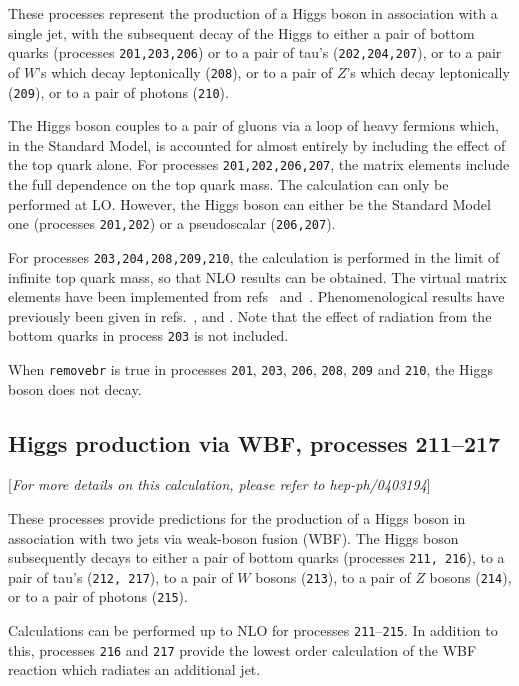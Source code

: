 \documentclass[12pt]{article}
\begin{document}
These processes represent the production of a Higgs boson in association
with a single jet, with the subsequent decay of the Higgs to either
a pair of bottom quarks (processes {\tt 201,203,206}) 
or to a pair of tau's ({\tt 202,204,207}),
or to a pair of $W$'s which decay leptonically ({\tt 208}),
or to a pair of $Z$'s which decay leptonically ({\tt 209}),
or to a pair of photons ({\tt 210}).

The Higgs boson couples to a pair of gluons via a loop of heavy fermions
which, in the Standard Model, is accounted for almost entirely by including
the effect of the top quark alone. For processes {\tt 201,202,206,207}, the
matrix elements include the full dependence on the top quark mass.
The calculation can only be performed at LO. 
However, the Higgs boson can either be the Standard Model one
(processes {\tt 201,202}) or a pseudoscalar ({\tt 206,207}).

For processes {\tt 203,204,208,209,210}, the calculation is performed in the
limit of infinite top quark mass, so that NLO results can be obtained.
The virtual matrix elements have been implemented from
refs~\cite{Ravindran:2002dc} and~\cite{Schmidt:1997wr}.
Phenomenological results have previously been 
given in refs.~\cite{deFlorian:1999zd},\cite{Ravindran:2002dc} 
and \cite{Glosser:2002gm}.
Note that the effect of radiation from the bottom quarks in process {\tt 203}
is not included.

When {\tt removebr} is true in processes {\tt 201}, {\tt 203}, {\tt 206}, {\tt 208}, {\tt 209}
and {\tt 210}, the Higgs boson does not decay.

\subsection{Higgs production via WBF, processes 211--217}
\label{subsec:wbf}

\begin{center}
[{\it For more details on this calculation, please refer to hep-ph/0403194}]
\end{center}

These processes provide predictions for the production of a Higgs boson in
association with two jets via weak-boson fusion (WBF). The Higgs boson
subsequently decays to either a pair of bottom quarks
(processes {\tt 211, 216}), to a pair of tau's ({\tt 212, 217}), 
to a pair of $W$ bosons ({\tt 213}),
to a pair of $Z$ bosons ({\tt 214}),
or to a pair of photons ({\tt 215}).

Calculations can be performed up to NLO for processes {\tt 211}--{\tt 215}.
In addition to this, processes {\tt 216} and {\tt 217} provide the lowest
order calculation of the WBF reaction which radiates an additional jet. 
\end{document}
